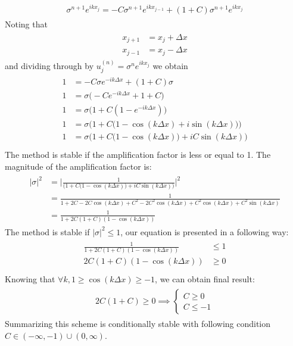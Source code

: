 	\begin{align}
		\begin{split}
			\sigma ^{n+1}e^{ikx_j} =  -C\sigma^{n+1}e^{ikx_{j-1}} + (1+C)\sigma^{n+1}e^{ikx_j}
		\end{split}
	\end{align}
	Noting that	
	\begin{align}
		\begin{split}
			x_{j+1} &= x_j + \Delta x \\
			x_{j-1} &= x_j - \Delta x
		\end{split}
	\end{align}	
	and dividing through by $u_j^{(n)} = \sigma^ne^{ikx_j}$ we obtain
	\begin{align}
		\begin{split}
			1 &= -C\sigma e^{-ik \Delta x} + (1+C)\sigma\\ 
			1 &= \sigma \big(-Ce^{-ik \Delta x} + 1 + C\big)\\
			1 &= \sigma \big(1 + C(1 -e^{-ik \Delta x})\big)\\	
			1 &= \sigma \Big(1 + C\big(1- \cos(k\Delta x) + i\sin(k\Delta x)\big)\Big) \\
			1 &= \sigma \Big(1 + C\big(1- \cos(k\Delta x)\big)+ iC\sin(k\Delta x)\Big) \\	
		\end{split}
	\end{align}
	The method is stable if the amplification factor is less or equal to 1. The magnitude of the amplification factor is:
	\begin{align}
		\begin{split}
		\label{app:for:sigmaImplicit}
			|\sigma|^2 &= \Bigg|\frac{1}{\Big(1 + C\big(1- \cos(k\Delta x)\big)+ iC\sin(k\Delta x)\Big)}\Bigg|^2 \\	
			&= \frac{1}{1 + 2C -2C\cos(k\Delta x) + C^2 - 2C^2\cos(k\Delta x) + C^2\cos(k\Delta x) + C^2\sin(k\Delta x)} \\
			&= \frac{1}{1 + 2C(1+C)(1-\cos(k\Delta x))}
		\end{split}
	\end{align} 
	The method is stable if $|\sigma|^2 \leq 1$, our equation is presented in a following way:	
	\begin{align}
		\begin{split}
			\frac{1}{1 + 2C(1+C)(1-\cos(k\Delta x))} &\leq 1 \\
			2C(1+C)(1-\cos(k\Delta x)) &\geq 0 \\
		\end{split}
	\end{align} 	
	Knowing that $ \forall k,  1 \geq \cos(k\Delta x) \geq -1$, we can obtain final result:	
	\begin{align}
		\begin{split}			
			2C(1+C)\geq 0 \implies 
			\begin{cases}
			C \geq 0 \\
			C \leq -1
			\end{cases}
		\end{split}
	\end{align} 	
	Summarizing this scheme is conditionally stable with following condition $C \in \left(-\infty, -1\right)\cup \left(0, \infty \right)$.
		